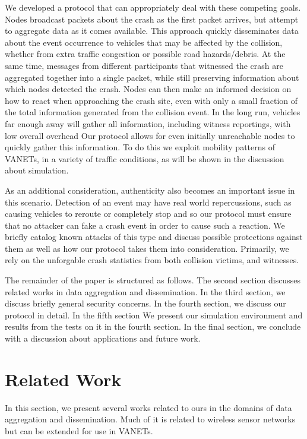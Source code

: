 \documentclass{IEEEtran}
\begin{document}
We developed a protocol that can appropriately deal with these competing goals. Nodes broadcast packets about the crash as the first packet arrives, but attempt to aggregate data as it comes available.
This approach quickly disseminates data about the event occurrence to vehicles that may be affected by the collision, whether from extra traffic congestion or possible road hazards/debris.
At the same time, messages from different participants that witnessed the crash are aggregated together into a single packet, while still preserving information about which nodes detected the crash.
Nodes can then make an informed decision on how to react when approaching the crash site, even with only a small fraction of the total information generated from the collision event.
In the long run, vehicles far enough away will gather all information, including witness reportings, with low overall overhead
Our protocol allows for even initially unreachable nodes to quickly gather this information. To do this we exploit mobility patterns of VANETs,  in a variety of traffic conditions, as will be shown in the discussion about simulation.

As an additional consideration, authenticity also becomes an important issue in this scenario.
Detection of an event may have real world repercussions, such as causing vehicles to reroute or completely stop and so our protocol must ensure that no attacker can fake a crash event in order to cause such a reaction.
We briefly catalog known attacks of this type and discuss possible protections against them as well as how our protocol takes them into consideration.
Primarily, we rely on the unforgable  crash statistics from both collision victims, and witnesses. 

The remainder of the paper is structured as follows.  The second section discusses related works in data aggregation and dissemination.
In the third section, we discuss briefly general security concerns.
In the fourth section, we discuss our protocol in detail. In the fifth section We present our simulation environment and results from the tests on it in the fourth section. 
In the final section, we conclude with a discussion about applications and future work.

\section{Related Work}

In this section, we present several works related to ours in the domains of data aggregation and dissemination.  Much of it is related to wireless sensor networks but can be extended for use in VANETs.
\end{document}
